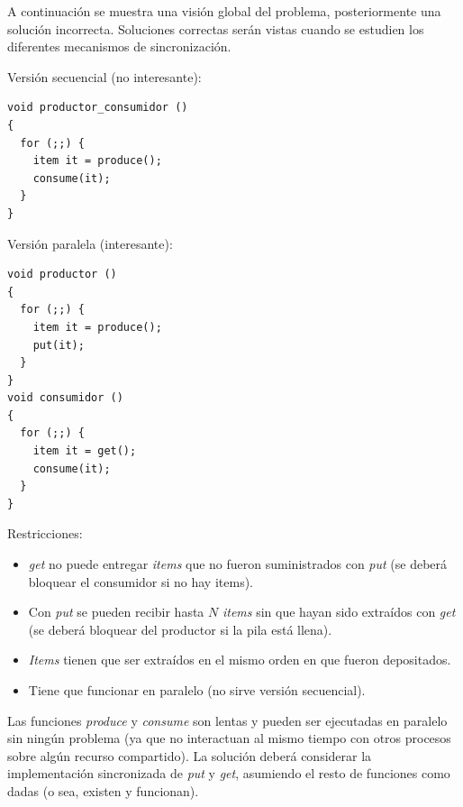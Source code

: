 A continuación se muestra una visión global del problema, posteriormente una
solución incorrecta. Soluciones correctas serán vistas cuando se estudien los
diferentes mecanismos de sincronización.

Versión secuencial (no interesante):
\begin{lstlisting}
void productor_consumidor ()
{
  for (;;) {
    item it = produce();
    consume(it);
  }
}
\end{lstlisting}

Versión paralela (interesante):
\begin{lstlisting}
void productor ()
{
  for (;;) {
    item it = produce();
    put(it);
  }
}
void consumidor ()
{
  for (;;) {
    item it = get();
    consume(it);
  }
}
\end{lstlisting}

Restricciones:
\begin{itemize}

\item \emph{get} no puede entregar \emph{items} que no fueron suministrados
con \emph{put} (se deberá bloquear el consumidor si no hay items).
	
\item Con \emph{put} se pueden recibir hasta $N$ \emph{items} sin que hayan
sido extraídos con \emph{get} (se deberá bloquear del productor si la pila
está llena).

\item \emph{Items} tienen que ser extraídos en el mismo orden en que fueron
depositados.

\item Tiene que funcionar en paralelo (no sirve versión secuencial).

\end{itemize}

Las funciones \emph{produce} y \emph{consume} son lentas y pueden ser
ejecutadas en paralelo sin ningún problema (ya que no interactuan al mismo
tiempo con otros procesos sobre algún recurso compartido). La solución deberá
considerar la implementación sincronizada de \emph{put} y \emph{get},
asumiendo el resto de funciones como dadas (o sea, existen y funcionan).

